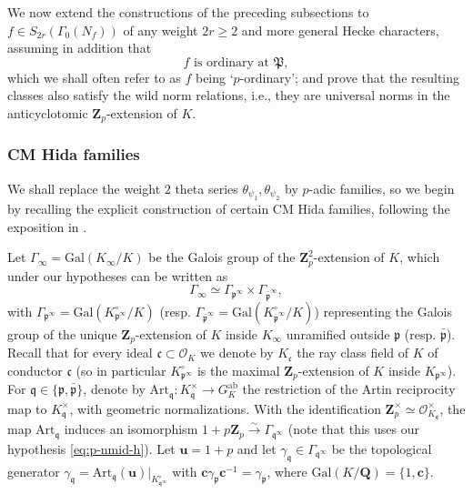 \documentclass[10pt,letterpaper]{amsart}
\theoremstyle{plain}
\theoremstyle{definition}
\theoremstyle{definition}
\theoremstyle{plain}
\theoremstyle{plain}
\theoremstyle{plain}
\theoremstyle{remark}
\numberwithin{equation}{section}
\newcommand{\cc}{\mathbf{c}}
\newcommand{\pp}{\mathfrak{p}}
\newcommand{\ppbar}{\bar{\mathfrak{p}}}
\newcommand{\fkm}{\mathfrak{m}}
\newcommand{\qq}{\mathfrak{q}}
\def\cO{\mathcal O}
\newcommand{\Q}{\mathbf{Q}}
\newcommand{\Z}{\mathbf{Z}}
\begin{document}
We %
now extend the constructions of the preceding subsections to $f\in S_{2r}(\Gamma_0(N_f))$ of any weight $2r\geq 2$ and more general Hecke characters, assuming in addition that
\begin{equation}
\textrm{$f$ is ordinary at $\mathfrak{P}$},\tag{ord}
\end{equation}
which we shall often refer to as $f$ being `$p$-ordinary'; and prove that the resulting classes 
also satisfy the wild norm relations, i.e., they are universal norms in the anticyclotomic $\Z_p$-extension of $K$.







\subsubsection{CM Hida families} 
\label{subsec:CM}

We shall replace the weight $2$ theta series $\theta_{\psi_1},\theta_{\psi_2}$ by $p$-adic families, so we begin by recalling the explicit construction of certain CM Hida families, following the exposition in \cite[\S{8.1}]{hsieh-triple}. 

Let $\Gamma_\infty={\mathrm{Gal}}(K_\infty/K)$ be the Galois group of the $\Z_p^2$-extension of $K$, which under our hypotheses can be written as 
\[
\Gamma_\infty\simeq\Gamma_{\pp^\infty}\times\Gamma_{\ppbar^\infty},
\]
with $\Gamma_{\pp^\infty}={\mathrm{Gal}}(K_{\pp^\infty}^{\circ}/K)$ (resp. $\Gamma_{\ppbar^\infty}={\mathrm{Gal}}(K^\circ_{\ppbar^\infty}/K)$) representing the Galois group of the unique $\Z_p$-extension of $K$ inside $K_\infty$ unramified outside $\pp$ (resp. $\ppbar$). Recall that for every ideal $\mathfrak{c}\subset\cO_K$ we denote by $K_\mathfrak{c}$ the ray class field of $K$ of conductor $\mathfrak{c}$ (so in particular $K_{\pp^\infty}^\circ$ is the maximal $\Z_p$-extension of $K$ inside $K_{\pp^\infty}$). For $\mathfrak{q}\in\{\pp,\ppbar\}$, denote by ${\mathrm{Art}}_{\qq}:K_{\qq}^\times\rightarrow G_K^{\mathrm{ab}}$ the restriction of the Artin reciprocity map to $K_{\qq}^\times$, with geometric normalizations. With the identification $\Z_p^\times\simeq\cO_{K_\qq}^\times$, the map ${\mathrm{Art}}_\qq$ induces an isomorphism $1+p\Z_p\xrightarrow{\sim}\Gamma_{\qq^\infty}$ (note that this uses our hypothesis \eqref{eq:p-nmid-h}). Let $\mathbf{u}=1+p$ and let $\gamma_{\mathfrak{q}}\in\Gamma_{\qq^\infty}$ be the topological generator $\gamma_\qq={\mathrm{Art}}_\qq(\mathbf{u})\vert_{K^\circ_{\qq^\infty}}$ with $\cc\gamma_\pp\cc^{-1}=\gamma_{\ppbar}$, where ${\mathrm{Gal}}(K/\Q)=\{1,\cc\}$. 
\end{document}
